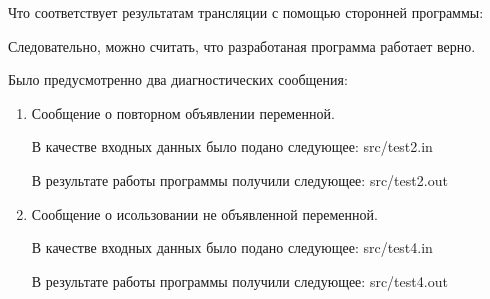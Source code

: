     Что соответствует результатам трансляции с помощью сторонней программы:
    \begin{figure}[h]
        \label{fig:image}
    \end{figure}

    Следовательно, можно считать, что разработаная программа работает верно.

    Было предусмотренно два диагностических сообщения:

    \begin{enumerate}
        \item Сообщение о повторном объявлении переменной.
        
        В качестве входных данных было подано следующее:
         {src/test2.in}
    
        В результате работы программы получили следующее:
         {src/test2.out}

        \item Сообщение о исользовании не объявленной переменной.
        
        В качестве входных данных было подано следующее:
         {src/test4.in}
    
        В результате работы программы получили следующее:
         {src/test4.out}
    \end{enumerate}

